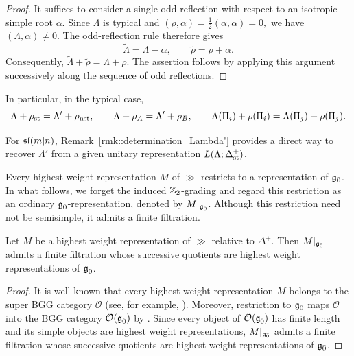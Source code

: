 \begin{proof}
It suffices to consider a single odd reflection with respect to an
isotropic simple root $\alpha$. Since $\Lambda$ is typical and
$
(\rho,\alpha)=\frac12(\alpha,\alpha)=0,
$
we have $(\Lambda,\alpha)\neq0$. The odd-reflection rule therefore
gives
\[
\widetilde{\Lambda}=\Lambda-\alpha,
\qquad
\widetilde{\rho}=\rho+\alpha.
\]
Consequently,
$
\widetilde{\Lambda}+\widetilde{\rho}
=
\Lambda+\rho.
$
The assertion follows by applying this argument successively along
the sequence of odd reflections.
\end{proof}

In particular, in the typical case,
\begin{equation}
\Lambda+\rho_{{\text{st}}}
=
\Lambda'+\rho_{{\text{nst}}},
\qquad
\Lambda+\rho_{A}
=
\Lambda'+\rho_{B}, \qquad \Lambda(\Uppi_i)+\rho(\Uppi_i)
=
\Lambda(\Uppi_j)+\rho(\Uppi_j).
\end{equation}

For ${\mathfrak{sl}(m\vert n)}$, Remark~\ref{rmk::determination_Lambda'} provides a direct way to recover $\Lambda'$ from a given unitary
representation $L(\Lambda;\Delta_{{\text{st}}}^{+})$.

Every highest weight representation $M$ of $\gg$ restricts to a representation of ${\mathfrak{g}_{\bar{0}}}$. In what follows, we forget the induced ${\mathbb Z}_2$-grading and regard this restriction as an ordinary ${\mathfrak{g}_{\bar{0}}}$-representation, denoted by $M\vert_{{\mathfrak{g}_{\bar{0}}}}$. Although this restriction need not be semisimple, it admits a finite filtration.

\begin{proposition}
 Let $M$ be a highest weight representation of $\gg$ relative to $\Delta^{+}$. Then $M\vert_{{\mathfrak{g}_{\bar{0}}}}$ admits a finite filtration whose successive quotients are highest weight representations of ${\mathfrak{g}_{\bar{0}}}$.
\end{proposition}

\begin{proof}
 It is well known that every highest weight representation $M$ belongs to the super BGG category $\mathcal{O}$ (see, for example, \cite{musson2012lie}). Moreover, restriction to ${\mathfrak{g}_{\bar{0}}}$ maps $\mathcal{O}$ into the BGG category $\mathcal{O}({\mathfrak{g}_{\bar{0}}})$ by \cite[Proposition~7.1]{Mazorchuk_Andersen}. Since every object of $\mathcal{O}({\mathfrak{g}_{\bar{0}}})$ has finite length and its simple objects are highest weight representations, $M\vert_{{\mathfrak{g}_{\bar{0}}}}$ admits a finite filtration whose successive quotients are highest weight representations of ${\mathfrak{g}_{\bar{0}}}$.
\end{proof}

